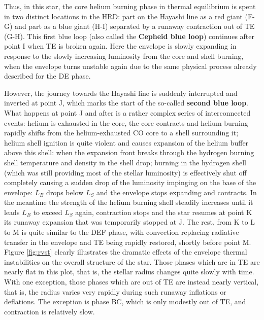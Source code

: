 \documentclass[a4paper,10pt]{article}
\begin{document}
{\noindent}Thus, in this star, the core helium burning phase in thermal equilibrium is spent in two distinct locations in the HRD: part on the Hayashi line as a red giant (F-G) and part as a blue giant (H-I) separated by a runaway contraction out of TE (G-H). This first blue loop (also called the \textbf{Cepheid blue loop}) continues after point I when TE is broken again. Here the envelope is slowly expanding in response to the slowly increasing luminosity from the core and shell burning, when the envelope turns unstable again due to the same physical process already described for the DE phase. 

{\noindent}However, the journey towards the Hayashi line is suddenly interrupted and inverted at point J, which marks the start of the so-called \textbf{second blue loop}. What happens at point J and after is a rather complex series of interconnected events: helium is exhausted in the core, the core contracts and helium burning rapidly shifts from the helium-exhausted CO core to a shell surrounding it; helium shell ignition is quite violent and causes expansion of the helium buffer above this shell: when the expansion front breaks through the hydrogen burning shell temperature and density in the shell drop; burning in the hydrogen shell (which was still providing most of the stellar luminosity) is effectively shut off completely causing a sudden drop of the luminosity impinging on the base of the envelope: $L_B$ drops below $L_S$ and the envelope stops expanding and contracts. In the meantime the strength of the helium burning shell steadily increases until it leads $L_B$ to exceed $L_S$ again, contraction stops and the star resumes at point K its runaway expansion that was temporarily stopped at J. The rest, from K to L to M is quite similar to the DEF phase, with convection replacing radiative transfer in the envelope and TE being rapidly restored, shortly before point M. Figure \ref{fig:rvst} clearly illustrates the dramatic effects of the envelope thermal instabilities on the overall structure of the star. Those phases which are in TE are nearly flat in this plot, that is, the stellar radius changes quite slowly with time. With one exception, those phases which are out of TE are instead nearly vertical, that is, the radius varies very rapidly during such runaway inflations or deflations. The exception is phase BC, which is only modestly out of TE, and contraction is relatively slow.
\end{document}
